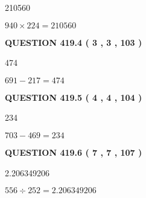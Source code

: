 \documentclass{ctexart}
\begin{document}
210560
 
 
 
 
\noindent{}

$ %
940 \times  %
224=   %
210560$
 
 
  
\vspace{0.2in}
  
{\textbf{\Large{QUESTION
419.4 
 ( 3 , 3 , 103 )
}}}
  
  
 
 
\noindent{}

474
 
 
 
 
\noindent{}

$ %
691 -  %
217=   %
474$
 
 
  
\vspace{0.2in}
  
{\textbf{\Large{QUESTION
419.5 
 ( 4 , 4 , 104 )
}}}
  
  
 
 
\noindent{}

234
 
 
 
 
\noindent{}

$ %
703 -  %
469=   %
234$
 
 
  
\vspace{0.2in}
  
{\textbf{\Large{QUESTION
419.6 
 ( 7 , 7 , 107 )
}}}
  
  
 
 
\noindent{}

2.206349206
 
 
 
 
\noindent{}

$ %
556 \div  %
252=   %
2.206349206$
 
 
  
\vspace{0.2in}
  
\end{document}
